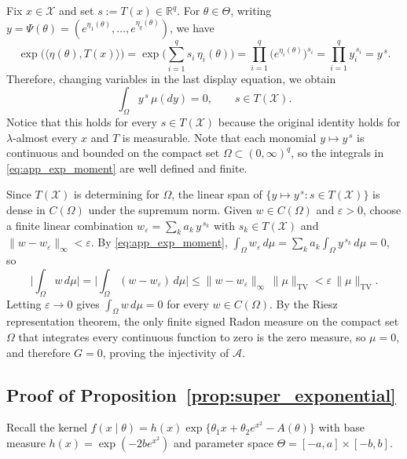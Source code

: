\documentclass[11pt,twoside]{article} %
\begin{document}
Fix $x\in\mathcal X$ and set $s:=T(x)\in\mathbb R^q$.
For $\theta\in\Theta$, writing $y=\Psi(\theta)=(e^{\eta_1(\theta)},\dots,e^{\eta_q(\theta)})$, we have
\begin{equation*}
    \exp\big(\langle\eta(\theta),T(x)\rangle\big)
    =\exp\Big(\sum_{i=1}^q s_i\,\eta_i(\theta)\Big)
    =\prod_{i=1}^q\big(e^{\eta_i(\theta)}\big)^{s_i}
    =\prod_{i=1}^q y_i^{\,s_i}=y^{\,s}.
\end{equation*}
Therefore, changing variables in the last display equation, we obtain
\begin{equation}
    \int_\Omega y^{\,s}\,\mu(dy)=0,\qquad s\in T(\mathcal X).
    \label{eq:app_exp_moment}
\end{equation}
Notice that this holds for every $s\in T(\mathcal X)$ because the original
identity holds for $\lambda$-almost every $x$ and $T$ is measurable. Note that each monomial $y\mapsto y^{\,s}$
is continuous and bounded on the compact set $\Omega\subset(0,\infty)^q$, so the integrals in
\eqref{eq:app_exp_moment} are well defined and finite.

Since $T(\mathcal X)$ is determining for $\Omega$, the linear
span of $\{y\mapsto y^{\,s}:s\in T(\mathcal X)\}$ is dense in $C(\Omega)$ under the supremum norm. Given
$w\in C(\Omega)$ and $\varepsilon>0$, choose a finite linear combination
$w_\varepsilon=\sum_k a_k\,y^{\,s_k}$ with $s_k\in T(\mathcal X)$ and $\|w-w_\varepsilon\|_\infty<\varepsilon$.
By \eqref{eq:app_exp_moment}, $\int_\Omega w_\varepsilon\,d\mu=\sum_k a_k\int_\Omega y^{\,s_k}\,d\mu=0$, so
\begin{equation*}
    \Big|\int_\Omega w\,d\mu\Big|
    =\Big|\int_\Omega (w-w_\varepsilon)\,d\mu\Big|
    \le\|w-w_\varepsilon\|_\infty\,\|\mu\|_{\mathrm{TV}}
    <\varepsilon\,\|\mu\|_{\mathrm{TV}} .
\end{equation*}
Letting $\varepsilon\to0$ gives $\int_\Omega w\,d\mu=0$ for every $w\in C(\Omega)$. By the Riesz
representation theorem, the only finite signed Radon measure on the compact set $\Omega$ that integrates every
continuous function to zero is the zero measure, so $\mu=0$, and therefore $G=0$, proving the injectivity of $\mathcal A$.

\subsection{Proof of Proposition~\ref{prop:super_exponential}}
\label{app:proof:prop_super_exponential}

Recall the kernel $f(x\mid\theta)=h(x)\exp\{\theta_1x+\theta_2e^{x^2}-A(\theta)\}$ with base measure
$h(x)=\exp(-2be^{x^2})$ and parameter space $\Theta=[-a,a]\times[-b,b]$.
\end{document}
